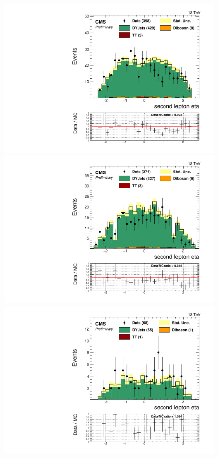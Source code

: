 \begin{figure}[h]
\begin{center}
\includegraphics[scale=0.37]{figures/control/etalep2MLP.pdf}
\includegraphics[scale=0.37]{figures/control/etalep2ELP.pdf}\\[2cm]
\includegraphics[scale=0.37]{figures/control/etalep2MHP.pdf}

\end{center}
\end{figure}
